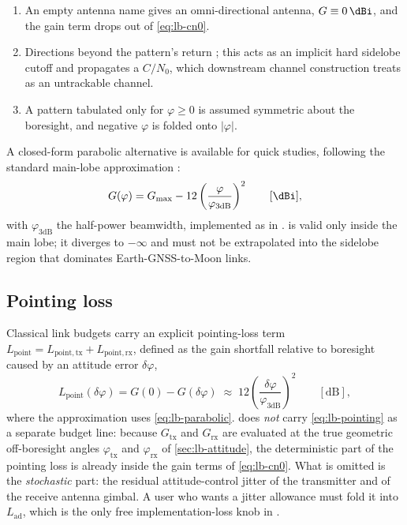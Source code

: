 \begin{enumerate}[leftmargin=1.6em]
  \item An empty antenna name gives an omni-directional antenna,
        $G \equiv \SI{0}{\dBi}$, and the gain term drops out of
        \cref{eq:lb-cn0}.
  \item Directions beyond the pattern's  return ;
        this acts as an implicit hard sidelobe cutoff and propagates a
         $C/N_0$, which downstream channel construction treats as
        an untrackable channel.
  \item A pattern tabulated only for $\varphi \ge 0$ is assumed symmetric
        about the boresight, and negative $\varphi$ is folded onto
        $\lvert\varphi\rvert$.
\end{enumerate}

A closed-form parabolic alternative is available for quick studies, following
the standard main-lobe approximation \citep{kaplan2017}:
\begin{equation}
  G(\varphi)
  =
  G_\mathrm{max}
  - 12\left(\frac{\varphi}{\varphi_\mathrm{3dB}}\right)^{2}
  \qquad [\si{\dBi}],
  \label{eq:lb-parabolic}
\end{equation}
with $\varphi_\mathrm{3dB}$ the half-power beamwidth, implemented as
 in .
 is valid only inside the main lobe; it diverges to
$-\infty$ and must not be extrapolated into the sidelobe region that dominates
Earth-GNSS-to-Moon links.

\subsection{Pointing loss}
\label{sec:lb-pointing}

Classical link budgets carry an explicit pointing-loss term
$L_\mathrm{point} = L_\mathrm{point,tx} + L_\mathrm{point,rx}$, defined as the
gain shortfall relative to boresight caused by an attitude error
$\delta\varphi$,
\begin{equation}
  L_\mathrm{point}(\delta\varphi)
  =
  G(0) - G(\delta\varphi)
  \;\approx\;
  12\left(\frac{\delta\varphi}{\varphi_\mathrm{3dB}}\right)^{2}
  \qquad [\si{\dB}],
  \label{eq:lb-pointing}
\end{equation}
where the approximation uses \cref{eq:lb-parabolic}.  \lupnt{} does \emph{not}
carry \cref{eq:lb-pointing} as a separate budget line: because
$G_\mathrm{tx}$ and $G_\mathrm{rx}$ are evaluated at the true geometric
off-boresight angles $\varphi_\mathrm{tx}$ and $\varphi_\mathrm{rx}$ of
\cref{sec:lb-attitude}, the deterministic part of the pointing loss is already
inside the gain terms of \cref{eq:lb-cn0}.  What is omitted is the
\emph{stochastic} part: the residual attitude-control jitter of the
transmitter and of the receive antenna gimbal.  A user who wants a jitter
allowance must fold it into $L_\mathrm{ad}$, which is the only free
implementation-loss knob in .

